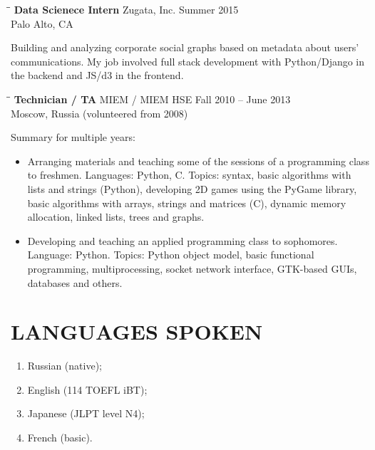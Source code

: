 \documentclass{res}
\begin{document}
\begin{resume}
\vspace{-0.1in}	
\begin{tabbing}
\hspace{2in}\= \hspace{2in}\= \kill %
{\bf Data Scienece Intern} \>Zugata, Inc. \>Summer 2015\\
			\>Palo Alto, CA \> 
\end{tabbing}      %
Building and analyzing corporate social graphs based on metadata about users' communications. My job involved full stack development with Python/Django in the backend and JS/d3 in the frontend.

\vspace{-0.1in}	
\begin{tabbing}
\hspace{2in}\= \hspace{2in}\= \kill %
{\bf Technician / TA} \>MIEM / MIEM HSE \>Fall 2010 -- June 2013\\
			\>Moscow, Russia \> (volunteered from 2008)
\end{tabbing}      %
Summary for multiple years:
\begin{itemize}
	\item
		Arranging materials and teaching some of the sessions of a programming class to freshmen. Languages: Python, C. Topics: syntax, basic algorithms with lists and strings (Python), developing 2D games using the PyGame library, basic algorithms with arrays, strings and matrices (C), dynamic memory allocation, linked lists, trees and graphs.
	\item
		Developing and teaching an applied programming class to sophomores. Language: Python. Topics: Python object model, basic functional programming, multiprocessing, socket network interface, GTK-based GUIs, databases and others.
\end{itemize}

\section{LANGUAGES SPOKEN}
\begin{enumerate}
	\item
		Russian (native);
	\item
		English (114 TOEFL iBT);
	\item
		Japanese (JLPT level N4);
	\item
		French (basic).
\end{enumerate}
 

\end{resume}
\end{document}
